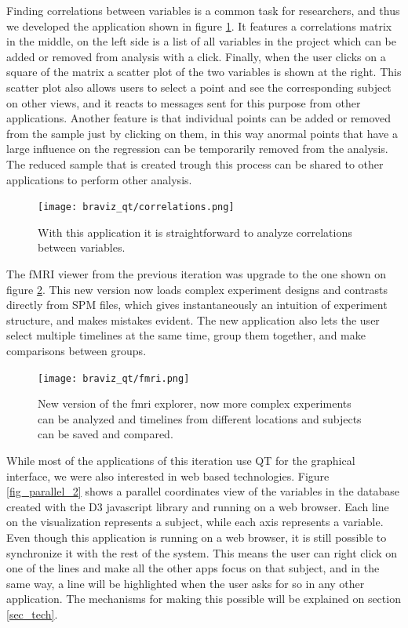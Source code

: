 Finding correlations between variables is a common task for researchers, and thus we developed the application shown in figure \ref{fig_correlations}. It features a correlations matrix in the middle, on the left side is a list of all variables in the project which can be added or removed from analysis with a click. Finally, when the user clicks on a square of the matrix a scatter plot of the two variables is shown at the right. This scatter plot also allows users to select a point and see the corresponding subject on other views, and it reacts to messages sent for this purpose from other applications. Another feature is that individual points can be added or removed from the sample just by clicking on them, in this way anormal points that have a large influence on the regression can be temporarily removed from the analysis. The reduced sample that is created trough this process can be shared to other applications to perform other analysis.

\begin{figure}
\centering
\texttt{[image: braviz\_qt/correlations.png]} 
\caption{\label{fig_correlations}With this application it is straightforward to analyze correlations between variables.}
\end{figure}

The fMRI viewer from the previous iteration was upgrade to the one shown on figure \ref{fig_fmri_2}. This new version now loads complex experiment designs and contrasts directly from SPM files, which gives instantaneously an intuition of experiment structure, and makes mistakes evident. The new application also lets the user select multiple timelines at the same time, group them together, and make comparisons between groups. 

\begin{figure}
\centering
\texttt{[image: braviz\_qt/fmri.png]} 
\caption{\label{fig_fmri_2}New version of the fmri explorer, now more complex experiments can be analyzed and timelines from different locations and subjects can be saved and compared.}
\end{figure}

While most of the applications of this iteration use QT for the graphical interface, we were also interested in web based technologies. Figure \ref{fig_parallel_2} shows a parallel coordinates view of the variables in the database created with the D3 \autocite{bostock_d3_2011} javascript library and running on a web browser. Each line on the visualization represents a subject, while each axis represents a variable. Even though this application is running on a web browser, it is still possible to synchronize it with the rest of the system. This means the user can right click on one of the lines and make all the other apps focus on that subject, and in the same way, a line will be highlighted when the user asks for so in any other application. The mechanisms for making this possible will be explained on section \ref{sec_tech}.

